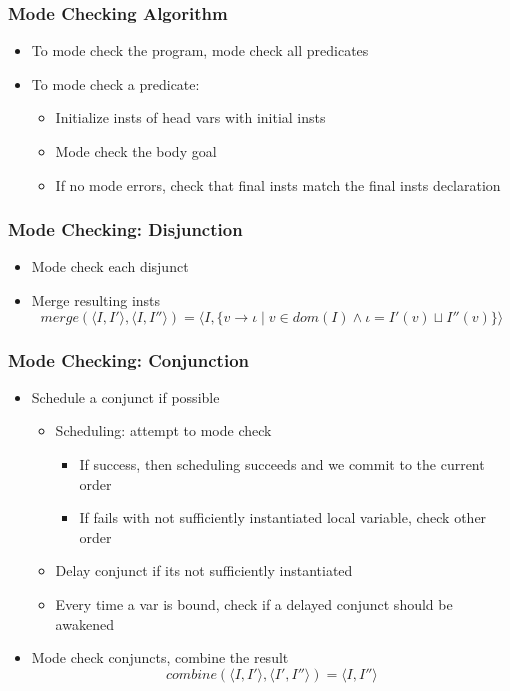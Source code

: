 \documentclass{beamer}
\begin{document}
\begin{frame}[fragile]
  \frametitle{Mode Checking Algorithm}
\begin{itemize}
  \item To mode check the program, mode check all predicates
  \item To mode check a predicate:
  \begin{itemize}
    \item Initialize insts of head vars with initial insts
    \item Mode check the body goal
    \item If no mode errors, check that final insts match the final insts declaration
  \end{itemize}
\end{itemize}
\end{frame}

\begin{frame}[fragile]
  \frametitle{Mode Checking: Disjunction}
  \begin{itemize}
    \item Mode check each disjunct
    \item Merge resulting insts
    $$
    merge(\langle I, I' \rangle, \langle I, I'' \rangle) = \langle I, \{ v \to \iota \mid v \in dom(I) \wedge \iota = I'(v) \sqcup I''(v) \}\rangle
    $$
  \end{itemize}

\end{frame}

\begin{frame}[fragile]
  \frametitle{Mode Checking: Conjunction}
  \begin{itemize}
    \item Schedule a conjunct if possible
    \begin{itemize}
      \item Scheduling: attempt to mode check
      \begin{itemize}
        \item If success, then scheduling succeeds and we commit to the current order
        \item If fails with not sufficiently instantiated local variable, check other order
      \end{itemize}
      \item Delay conjunct if its not sufficiently instantiated
      \item Every time a var is bound, check if a delayed conjunct should be awakened
    \end{itemize}
    \item Mode check conjuncts, combine the result
    $$
    combine(\langle I, I' \rangle, \langle I', I'' \rangle) = \langle I, I'' \rangle
    $$
  \end{itemize}

\end{frame}
\end{document}
